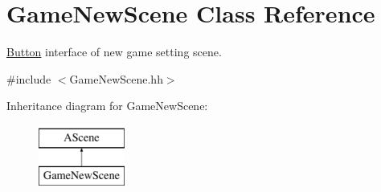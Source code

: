 \hypertarget{classGameNewScene}{}\section{Game\+New\+Scene Class Reference}
\label{classGameNewScene}


\hyperlink{classButton}{Button} interface of new game setting scene.  




{\ttfamily \#include $<$Game\+New\+Scene.\+hh$>$}

Inheritance diagram for Game\+New\+Scene\+:\begin{figure}[H]
\begin{center}
\leavevmode
\includegraphics[height=2.000000cm]{classGameNewScene}
\end{center}
\end{figure}
